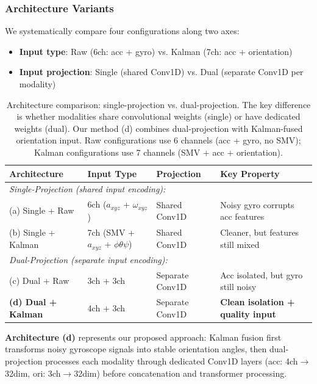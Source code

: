 \subsubsection{Architecture Variants}

We systematically compare four configurations along two axes:
\begin{itemize}
    \item \textbf{Input type}: Raw (6ch: acc + gyro) vs. Kalman (7ch: acc + orientation)
    \item \textbf{Input projection}: Single (shared Conv1D) vs. Dual (separate Conv1D per modality)
\end{itemize}

\begin{table}[H]
\caption{Architecture comparison: single-projection vs. dual-projection. The key difference is whether modalities share convolutional weights (single) or have dedicated weights (dual). Our method (d) combines dual-projection with Kalman-fused orientation input. Raw configurations use 6 channels (acc + gyro, no SMV); Kalman configurations use 7 channels (SMV + acc + orientation).}
\label{tab:architecture_comparison}
\centering
\small
\begin{tabular}{llll}
\toprule
\textbf{Architecture} & \textbf{Input Type} & \textbf{Projection} & \textbf{Key Property} \\
\midrule
\multicolumn{4}{l}{\textit{Single-Projection (shared input encoding):}} \\
(a) Single + Raw & 6ch ($a_{xyz}$ + $\omega_{xyz}$) & Shared Conv1D & Noisy gyro corrupts acc features \\
(b) Single + Kalman & 7ch (SMV + $a_{xyz}$ + $\phi\theta\psi$) & Shared Conv1D & Cleaner, but features still mixed \\
\midrule
\multicolumn{4}{l}{\textit{Dual-Projection (separate input encoding):}} \\
(c) Dual + Raw & 3ch + 3ch & Separate Conv1D & Acc isolated, but gyro still noisy \\
\textbf{(d) Dual + Kalman} & 4ch + 3ch & Separate Conv1D & \textbf{Clean isolation + quality input} \\
\bottomrule
\end{tabular}
\end{table}

\noindent\textbf{Architecture (d)} represents our proposed approach: Kalman fusion first transforms noisy gyroscope signals into stable orientation angles, then dual-projection processes each modality through dedicated Conv1D layers (acc: 4ch$\rightarrow$32dim, ori: 3ch$\rightarrow$32dim) before concatenation and transformer processing.

